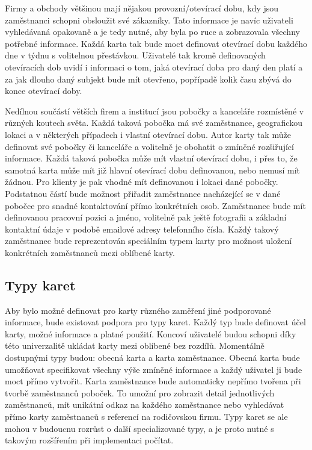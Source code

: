\begin{itemize}
\begin{itemize}
	Firmy a obchody většinou mají nějakou provozní/otevírací dobu, kdy jsou zaměstnanci schopni obsloužit své zákazníky.
	Tato informace je navíc uživateli vyhledávaná opakovaně a je tedy nutné, aby byla po ruce a zobrazovala všechny potřebné
	informace.
	Každá karta tak bude moct definovat otevírací dobu každého dne v týdnu s volitelnou přestávkou.
	Uživatelé tak kromě definovaných otevíracích dob uvidí i informaci o tom, jaká otevírací doba pro daný den platí
	a za jak dlouho daný subjekt bude mít otevřeno, popřípadě kolik času zbývá do konce otevírací doby.

	Nedílnou součástí větších firem a institucí jsou pobočky a kanceláře rozmístěné v různých koutech světa.
	Každá taková pobočka má své zaměstnance, geografickou lokaci a v některých případech i vlastní otevírací dobu.
	Autor karty tak může definovat své pobočky či kanceláře a volitelně je obohatit o zmíněné rozšiřující informace.
	Každá taková pobočka může mít vlastní otevírací dobu, i přes to, že samotná karta může mít již hlavní otevírací dobu
	definovanou, nebo nemusí mít žádnou.
	Pro klienty je pak vhodné mít definovanou i lokaci dané pobočky.
	Podstatnou částí bude možnost přiřadit zaměstnance nacházející se v dané pobočce pro snadné kontaktování přímo konkrétních
	osob.
	Zaměstnanec bude mít definovanou pracovní pozici a jméno, volitelně pak ještě fotografii a základní kontaktní údaje
	v podobě emailové adresy telefonního čísla.
	Každý takový zaměstnanec bude reprezentován speciálním typem karty pro možnost uložení konkrétních zaměstnanců mezi oblíbené
	karty.

	\subsection{Typy karet}

	Aby bylo možné definovat pro karty různého zaměření jiné podporované informace, bude existovat podpora pro typy karet.
	Každý typ bude definovat účel karty, možné informace a platné použití.
	Koncoví uživatelé budou schopni díky této univerzalitě ukládat karty mezi oblíbené bez rozdílů.
	Momentálně dostupnými typy budou: obecná karta a karta zaměstnance.
	Obecná karta bude umožňovat specifikovat všechny výše zmíněné informace a každý uživatel ji bude moct přímo vytvořit.
	Karta zaměstnance bude automaticky nepřímo tvořena při tvorbě zaměstnanců poboček.
	To umožní pro zobrazit detail jednotlivých zaměstnanců, mít unikátní odkaz na každého zaměstnance nebo vyhledávat
	přímo karty zaměstnanců s referencí na rodičovskou firmu.
	Typy karet se ale mohou v budoucnu rozrůst o další specializované typy, a je proto nutné s takovým rozšířením při
	implementaci počítat.


\end{itemize}
\end{itemize}
